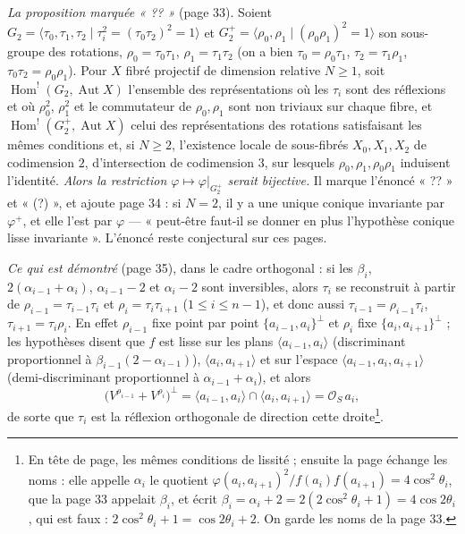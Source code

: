 \documentclass[11pt,a4paper]{article}
\begin{document}
\emph{La proposition marquée « ?? »} (page 33). Soient $G_2 = \langle \tau_0,
\tau_1, \tau_2 \mid \tau_i^2 = (\tau_0\tau_2)^2 = 1 \rangle$ et $G_2^+ =
\langle \rho_0, \rho_1 \mid (\rho_0\rho_1)^2 = 1 \rangle$ son sous-groupe des
rotations, $\rho_0 = \tau_0\tau_1$, $\rho_1 = \tau_1\tau_2$ (on a bien $\tau_0
= \rho_0\tau_1$, $\tau_2 = \tau_1\rho_1$, $\tau_0\tau_2 = \rho_0\rho_1$). Pour
$X$ fibré projectif de dimension relative $N \geqslant 1$, soit
$\operatorname{Hom}^!(G_2, \operatorname{Aut} X)$ l'ensemble des représentations
où les $\tau_i$ sont des réflexions et où $\rho_0^2$, $\rho_1^2$ et le
commutateur de $\rho_0, \rho_1$ sont non triviaux sur chaque fibre, et
$\operatorname{Hom}^!(G_2^+, \operatorname{Aut} X)$ celui des représentations
des rotations satisfaisant les mêmes conditions et, si $N \geqslant 2$,
l'existence locale de sous-fibrés $X_0, X_1, X_2$ de codimension $2$, d'intersection
de codimension $3$, sur lesquels $\rho_0, \rho_1, \rho_0\rho_1$ induisent
l'identité. \emph{Alors la restriction $\varphi \mapsto \varphi|_{G_2^+}$ serait
bijective.} Il marque l'énoncé « ?? » et « (?) », et ajoute page 34 : si $N = 2$,
il y a une unique conique invariante par $\varphi^+$, et elle l'est par
$\varphi$ --- « peut-être faut-il se donner en plus l'hypothèse conique lisse
invariante ». L'énoncé reste conjectural sur ces pages.

\emph{Ce qui est démontré} (page 35), dans le cadre orthogonal : si les $\beta_i$,
$2(\alpha_{i-1} + \alpha_i)$, $\alpha_{i-1} - 2$ et $\alpha_i - 2$ sont
inversibles, alors $\tau_i$ se reconstruit à partir de $\rho_{i-1} =
\tau_{i-1}\tau_i$ et $\rho_i = \tau_i\tau_{i+1}$ ($1 \leqslant i \leqslant
n-1$), et donc aussi $\tau_{i-1} = \rho_{i-1}\tau_i$, $\tau_{i+1} =
\tau_i\rho_i$. En effet $\rho_{i-1}$ fixe point par point $\{a_{i-1},
a_i\}^\perp$ et $\rho_i$ fixe $\{a_i, a_{i+1}\}^\perp$ ; les hypothèses disent
que $f$ est lisse sur les plans $\langle a_{i-1}, a_i \rangle$ (discriminant
proportionnel à $\beta_{i-1}(2 - \alpha_{i-1})$), $\langle a_i, a_{i+1} \rangle$
et sur l'espace $\langle a_{i-1}, a_i, a_{i+1} \rangle$ (demi-discriminant
proportionnel à $\alpha_{i-1} + \alpha_i$), et alors
\[
\bigl(V^{\rho_{i-1}} + V^{\rho_i}\bigr)^\perp = \langle a_{i-1}, a_i \rangle
\cap \langle a_i, a_{i+1} \rangle = \mathcal{O}_S\, a_i ,
\]
de sorte que $\tau_i$ est la réflexion orthogonale de direction cette
droite\footnote{En tête de page, les mêmes conditions de lissité ; ensuite la
page échange les noms : elle appelle $\alpha_i$ le quotient
$\varphi(a_i, a_{i+1})^2/f(a_i)f(a_{i+1}) = 4\cos^2\theta_i$, que la page 33
appelait $\beta_i$, et écrit $\beta_i = \alpha_i + 2 = 2(2\cos^2\theta_i + 1) =
4\cos 2\theta_i$, qui est faux : $2\cos^2\theta_i + 1 = \cos 2\theta_i + 2$. On
garde les noms de la page 33.}.
\end{document}
